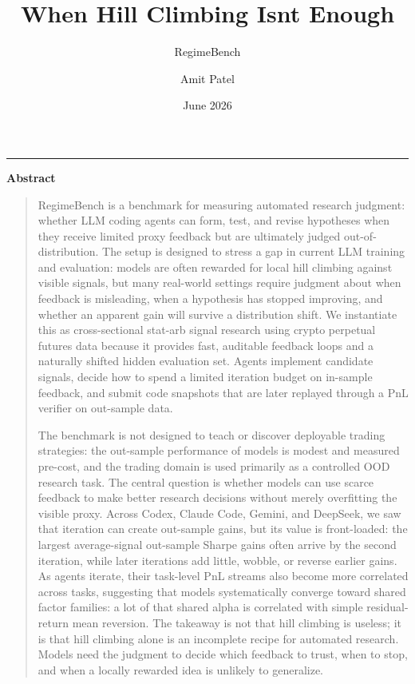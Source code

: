 \documentclass[
]{article}
\title{When Hill Climbing Isn\textquotesingle t Enough}
\subtitle{RegimeBench}
\author{Amit Patel}
\date{June 2026}
\makeatletter
\def\@subtitle{}
\def\@contactemail{}
\renewcommand{\maketitle}{%
  \begingroup
    \vspace*{-0.34in}
    {\LARGE\bfseries \@title\par}
    \ifx\@subtitle\@empty\else
      \vspace{0.035in}
      {\large\color{RegimeMuted}\@subtitle\par}
    \fi
    \ifx\@author\@empty\else
      \vspace{0.035in}
      {\normalsize\color{RegimeInk}\@author\par}
      \ifx\@contactemail\@empty\else
        \vspace{0.012in}
        {\small\href{mailto:\@contactemail}{\texttt{\@contactemail}}\par}
      \fi
    \fi
    \vspace{0.055in}
    {\small\color{RegimeMuted}\hfill \@date\par}
    \vspace{0.06in}
    {\color{RegimeRule}\rule{\textwidth}{0.6pt}\par}
    \vspace{0.10in}
  \endgroup
}
\renewenvironment{abstract}{%
  \begin{center}
  \bfseries Abstract
  \end{center}
  \begin{quote}
  \small
}{%
  \end{quote}
  \vspace{0.08in}
}
\makeatother
\begin{document}
\maketitle

\begin{abstract}

RegimeBench is a benchmark for measuring automated research judgment: whether LLM coding agents can form, test, and revise hypotheses when they receive limited proxy feedback but are ultimately judged out-of-distribution. The setup is designed to stress a gap in current LLM training and evaluation: models are often rewarded for local hill climbing against visible signals, but many real-world settings require judgment about when feedback is misleading, when a hypothesis has stopped improving, and whether an apparent gain will survive a distribution shift. We instantiate this as cross-sectional stat-arb signal research using crypto perpetual futures data because it provides fast, auditable feedback loops and a naturally shifted hidden evaluation set. Agents implement candidate signals, decide how to spend a limited iteration budget on in-sample feedback, and submit code snapshots that are later replayed through a PnL verifier on out-sample data.

The benchmark is not designed to teach or discover deployable trading strategies: the out-sample performance of models is modest and measured pre-cost, and the trading domain is used primarily as a controlled OOD research task. The central question is whether models can use scarce feedback to make better research decisions without merely overfitting the visible proxy. Across Codex, Claude Code, Gemini, and DeepSeek, we saw that iteration can create out-sample gains, but its value is front-loaded: the largest average-signal out-sample Sharpe gains often arrive by the second iteration, while later iterations add little, wobble, or reverse earlier gains. As agents iterate, their task-level PnL streams also become more correlated across tasks, suggesting that models systematically converge toward shared factor families: a lot of that shared alpha is correlated with simple residual-return mean reversion. The takeaway is not that hill climbing is useless; it is that hill climbing alone is an incomplete recipe for automated research. Models need the judgment to decide which feedback to trust, when to stop, and when a locally rewarded idea is unlikely to generalize.


\end{abstract}
\end{document}
